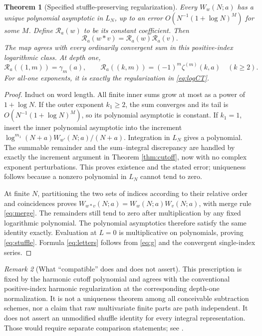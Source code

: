 \documentclass[11pt,a4paper]{article}
\numberwithin{equation}{section}
\newtheorem{theorem}{Theorem}[section]
\theoremstyle{definition}\newtheorem{definition}[theorem]{Definition}
\theoremstyle{remark}\newtheorem{remark}[theorem]{Remark}
\newcommand{\RR}{\mathcal R}
\begin{document}
\begin{theorem}[Specified stuffle-preserving regularization]
\label{thm:stuffle}
Every $W_w(N;a)$ has a unique polynomial asymptotic in $L_N$, up to an
error $O(N^{-1}(1+\log N)^M)$ for some $M$. Define $\RR_a(w)$ to be its
constant coefficient. Then
\begin{equation}\label{eq:stuffle}
 \RR_a(w\ast v)=\RR_a(w)\RR_a(v).
\end{equation}
The map agrees with every ordinarily convergent sum in this positive-index
logarithmic class. At depth one,
\begin{equation}\label{eq:letters}
 \RR_a((1,m))=\gamma_m(a),\qquad
 \RR_a((k,m))=(-1)^m\zeta^{(m)}(k,a)\quad(k\ge2).
\end{equation}
For all-one exponents, it is exactly the regularization in
\eqref{eq:logCT}.
\end{theorem}
\begin{proof}
Induct on word length. All finite inner sums grow at most as a power of
$1+\log N$. If the outer exponent $k_1\ge2$, the sum converges and its
tail is $O(N^{-1}(1+\log N)^M)$, so its polynomial asymptotic is constant.
If $k_1=1$, insert the inner polynomial asymptotic into the increment
$\log^{m_1}(N+a)W_{w'}(N;a)/(N+a)$. Integration in $L_N$ gives a
polynomial. The summable remainder and the sum--integral discrepancy are
handled by exactly the increment argument in Theorem \ref{thm:cutoff},
now with no complex exponent perturbations. This proves existence and
the stated error; uniqueness follows because a nonzero polynomial in
$L_N$ cannot tend to zero.

At finite $N$, partitioning the two sets of indices according to their
relative order and coincidences proves
$W_{w\ast v}(N;a)=W_w(N;a)W_v(N;a)$, with merge rule \eqref{eq:merge}.
The remainders still tend to zero after multiplication by any fixed
logarithmic polynomial. The polynomial asymptotics therefore satisfy
the same identity exactly. Evaluation at $L=0$ is multiplicative on
polynomials, proving \eqref{eq:stuffle}. Formula \eqref{eq:letters}
follows from \eqref{eq:g} and the convergent single-index series.
\end{proof}

\begin{remark}[What ``compatible'' does and does not assert]
This prescription is fixed by the harmonic cutoff polynomial and agrees
with the conventional positive-index harmonic regularization at the
corresponding depth-one normalization. It is not a uniqueness theorem
among all conceivable subtraction schemes, nor a claim that raw
multivariate finite parts are path independent. It does not assert an
unmodified shuffle identity for every integral representation. Those
would require separate comparison statements; see \cite{gz,gpxz}.
\end{remark}
\end{document}
